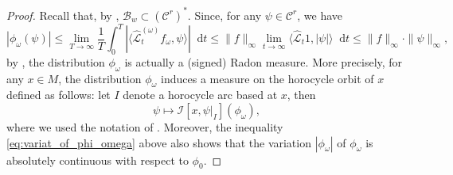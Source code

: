\documentclass[11pt,letterpaper]{amsart}
\newcommand \cL {{\mathcal L}}
\newcommand \cB {{\mathscr B}}
\newcommand*{\diff}{\mathop{}\!\mathrm{d}}
\theoremstyle{definition}
\begin{document}
\begin{proof}
Recall that, by , $\cB_w \subset (\mathscr{C}^r)^{\ast}$. Since, for any $\psi \in \mathscr{C}^r$, we have
	\begin{equation}\label{eq:variat_of_phi_omega}
	|\phi_{\omega}(\psi) |\leq \lim_{T \to \infty}  \frac{1}{T} \int_0^T  \left\lvert \langle {\hat \cL^{(\omega)}_t} f_{\omega}, \psi\rangle  \right\rvert \diff t \leq \|f\|_{\infty}  \lim_{t \to \infty}   \langle {\hat \cL_t} 1, | \psi | \rangle  \diff t \leq \|f\|_{\infty} \cdot \|\psi\|_{\infty},
	\end{equation}
	by \cite[Sec. I4]{Schw}, the distribution $\phi_{\omega}$ is actually a (signed) Radon measure. More precisely, for any $x \in M$, the distribution $\phi_{\omega}$ induces a measure on the horocycle orbit of $x$ defined as follows: let $I$ denote a horocycle arc based at $x$, then
	\[
	\psi \mapsto \mathcal{I}[x,\psi|_I](\phi_{\omega}),
	\]
	where we used the notation of . Moreover, the inequality \eqref{eq:variat_of_phi_omega} above also shows that the variation $|\phi_{\omega}|$ of $\phi_{\omega}$ is absolutely continuous with respect to $\phi_0$. 


\end{proof}
\end{document}
